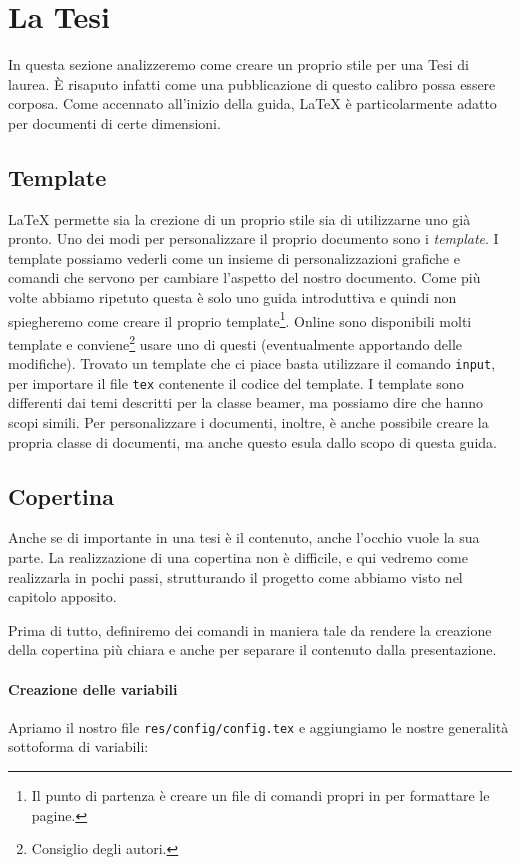 \section{La Tesi}
In questa sezione analizzeremo come creare un proprio stile per una Tesi di
laurea. È risaputo infatti come una pubblicazione di questo calibro possa
essere corposa. Come accennato all'inizio della guida, \LaTeX{} è
particolarmente adatto per documenti di certe dimensioni.

\subsection{Template}
\LaTeX{} permette sia la crezione di un proprio stile sia di utilizzarne uno 
già pronto. Uno dei modi per personalizzare il proprio documento sono i\textit{
template}. I template possiamo vederli come un insieme di personalizzazioni 
grafiche e comandi che servono per cambiare l'aspetto del nostro documento. 
Come più volte abbiamo ripetuto questa è solo uno guida introduttiva e quindi 
non spiegheremo come creare il proprio template\footnote{Il punto di partenza 
è creare un file di comandi propri in per formattare le pagine.}. Online sono 
disponibili molti template e conviene\footnote{Consiglio degli autori.} usare 
uno di questi (eventualmente apportando delle modifiche). Trovato un template 
che ci piace basta utilizzare il comando \texttt{input}, per importare il file 
\texttt{tex} contenente il codice del template. I template sono differenti dai 
temi descritti per la classe beamer, ma possiamo dire che hanno scopi simili. 
Per personalizzare i documenti, inoltre, è anche possibile creare la propria 
classe di documenti, ma anche questo esula dallo scopo di questa guida.

\subsection{Copertina}
Anche se di importante in una tesi è il contenuto, anche l'occhio vuole la sua
parte. La realizzazione di una copertina non è difficile, e qui vedremo come
realizzarla in pochi passi, strutturando il progetto come abbiamo visto nel
capitolo apposito. %

Prima di tutto, definiremo dei comandi in maniera tale da rendere la creazione
della copertina più chiara e anche per separare il contenuto dalla
presentazione.

\paragraph*{Creazione delle variabili} Apriamo il nostro file
\texttt{res/config/config.tex} e aggiungiamo le nostre generalità sottoforma di
variabili:

